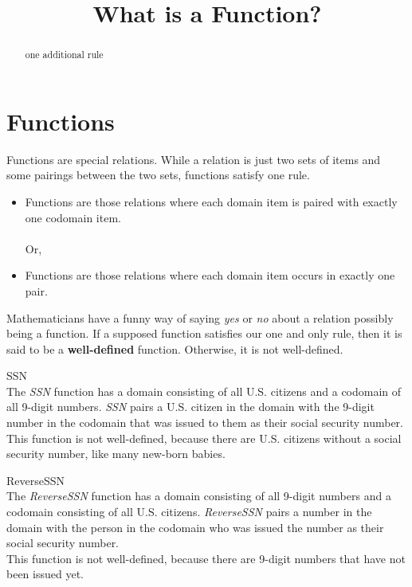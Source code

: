 \documentclass{ximera}
\title{What is a Function?}
\begin{document}
\begin{abstract}
one additional rule
\end{abstract}
\maketitle




\section{Functions}

Functions are special relations. While a relation is just two sets of items and some pairings between the two sets, functions satisfy one rule. 

\begin{itemize}
\item Functions are those relations where each domain item is paired with exactly one codomain item. \\  \\ Or, 
\item Functions are those relations where each domain item occurs in exactly one pair.
\end{itemize}


Mathematicians have a funny way of saying \textit{yes} or \textit{no} about a relation possibly being a function. If a supposed function satisfies our one and only rule, then it is said to be a \textbf{well-defined} function.  Otherwise, it is not well-defined.


\begin{example} SSN \\
The \textit{SSN} function has a domain consisting of all U.S. citizens and a codomain of all 9-digit numbers.  \textit{SSN} pairs a U.S. citizen in the domain with the 9-digit number in the codomain that was issued to them as their social security number. 
\\ 
This function is not well-defined, because there are U.S. citizens without a social security number, like many new-born babies.
\end{example}


\begin{example} ReverseSSN \\
The \textit{ReverseSSN} function has a domain consisting of all 9-digit numbers and a codomain consisting of all U.S. citizens.  \textit{ReverseSSN} pairs a number in the domain with the person in the codomain who was issued the number as their social security number. 
\\ 
This function is not well-defined, because there are 9-digit numbers that have not been issued yet.
\end{example}
\end{document}
